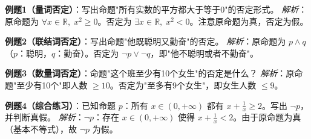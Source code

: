 \begin{examplebox}
\textbf{例题1（量词否定）}：写出命题"所有实数的平方都大于等于0"的否定形式。
\textit{解析}：原命题为 $\forall x\in\mathbb{R},\;x^2\ge 0$。否定为 $\exists x\in\mathbb{R},\;x^2<0$。注意原命题为真，否定为假。
\end{examplebox}

\begin{examplebox}
\textbf{例题2（联结词否定）}：写出命题"他既聪明又勤奋"的否定。
\textit{解析}：原命题为 $p\land q$（$p$：聪明，$q$：勤奋）。否定为 $\lnot p\lor\lnot q$，即"他不聪明或者不勤奋"。
\end{examplebox}

\begin{examplebox}
\textbf{例题3（数量词否定）}：命题"这个班至少有10个女生"的否定是什么？
\textit{解析}：原命题"至少有10个"即人数 $\ge 10$。否定为"至多有9个女生"，即女生人数 $\le 9$。
\end{examplebox}

\begin{examplebox}
\textbf{例题4（综合练习）}：已知命题 $p$：所有 $x\in(0,+\infty)$ 都有 $x+\frac{1}{x}\ge 2$。写出 $\lnot p$，并判断真假。
\textit{解析}：$\lnot p$：存在 $x\in(0,+\infty)$ 使得 $x+\frac{1}{x}<2$。由于原命题为真（基本不等式），故 $\lnot p$ 为假。
\end{examplebox}